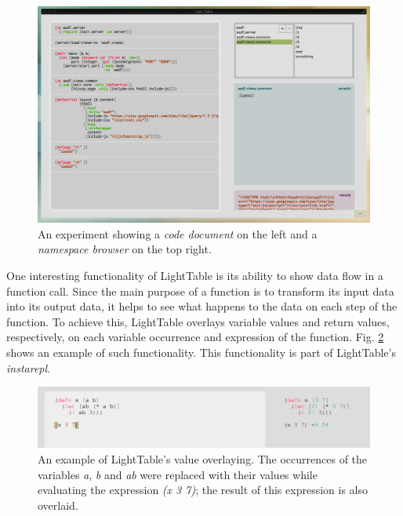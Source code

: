 \documentclass{./llncs2e/llncs}
\begin{document}
	\begin{figure}
	  \centering
	  \includegraphics[width=1.0\textwidth]{img/lt_clojure_table__inv}
	    \caption{An experiment showing a \emph{code document} on the left and a \emph{namespace browser} on the top right.}
	  \label{fig:lt:clojure:table}
	\end{figure} 

	One interesting functionality of LightTable is its ability to show data flow in a function call. 
	Since the main purpose of a function is to transform its input data into its output data, it helps to see what happens to the data on each step of the function. 
	To achieve this, LightTable overlays variable values and return values, respectively, on each variable occurrence and expression of the function. 
	Fig. \ref{fig:lt:val:overlay} shows an example of such functionality. 
	This functionality is part of LightTable's \emph{instarepl}.

	\begin{figure}
		\centering
		\includegraphics[width=1.0\textwidth]{img/lt_val_overlay__inv}
			\caption{An example of LightTable's value overlaying. The occurrences of the variables \emph{a}, \emph{b} and \emph{ab} were replaced with their values while evaluating the expression \emph{(x 3 7)}; the result of this expression is also overlaid.}
		\label{fig:lt:val:overlay}
	\end{figure}
\end{document}

